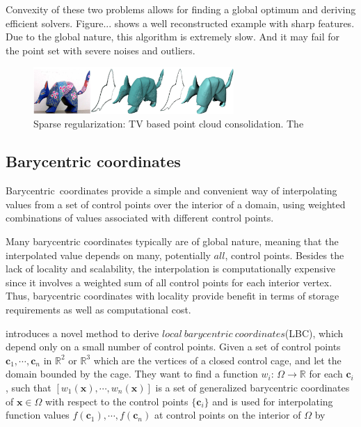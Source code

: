 Convexity of these two problems allows for finding a global optimum and deriving efficient solvers.
Figure... shows a well reconstructed example with sharp features.
Due to the global nature, this algorithm is extremely slow.
And it may fail for the point set with severe noises and outliers.

\begin{figure}[ht]
  \centering
  \includegraphics[width=3in]{images/TV_consolidation}
  \caption{Sparse regularization: TV based point cloud consolidation\cite{lipman2007parameterization}. The }
  \label{fig:TV consolidation}
\end{figure}


\subsection{Barycentric coordinates}
\label{subsec:Barycentric coordinates}

Barycentric~coordinates provide a simple and convenient way of interpolating values from a set of control points over the interior of a domain, using weighted combinations of values associated with different control points.

Many barycentric coordinates typically are of global nature, meaning that the interpolated value depends on many, potentially $all$, control points. Besides the lack of locality and scalability, the interpolation is computationally expensive since it involves a weighted sum of all control points for each interior vertex.
Thus, barycentric coordinates with locality provide benefit in terms of storage requirements as well as computational cost.

\cite{zhang2014local} introduces a novel method to derive $local~barycentric~coordinates$(LBC), which depend only on a small number of control points.
Given a set of control points $\mathbf{c}_1, \cdots, \mathbf{c}_n$ in $\mathbb{R}^2$ or  $\mathbb{R}^3$ which are the vertices of a closed control cage, and let the domain bounded by the cage.
They want to find a function $w_{i}$: $\Omega\rightarrow\mathbb{R}$ for each $\mathbf{c}_{i}$, such that $[w_1(\mathbf{x}), \cdots, w_n(\mathbf{x})]$ is a set of generalized barycentric coordinates of $\mathbf{x}\in\Omega$ with respect to the control points $\{\mathbf{c}_{i}\}$ and is used for interpolating function values $f(\mathbf{c}_1), \cdots, f(\mathbf{c}_n)$ at control points on the interior of $\Omega$ by

